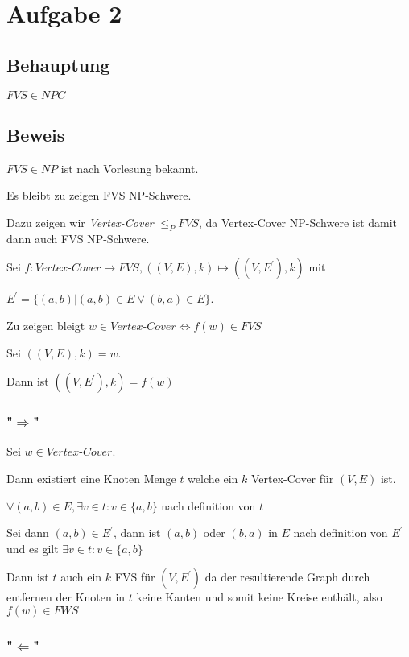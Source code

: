 \section*{Aufgabe 2}

\subsection*{Behauptung}

$FVS \in NPC$

\subsection*{Beweis}

$FVS \in NP$ ist nach Vorlesung bekannt.

Es bleibt zu zeigen FVS NP-Schwere.

Dazu zeigen wir \textit{Vertex-Cover} $\leq_P FVS$,
da Vertex-Cover NP-Schwere ist damit dann auch FVS NP-Schwere.

Sei $f: \textit{Vertex-Cover} \to FVS, ((V,E),k) \mapsto ((V,E^\prime),k)$ mit

 $E^\prime = \{(a,b) | (a,b) \in E \vee (b,a) \in E  \}$.
 
Zu zeigen bleigt $w \in \textit{Vertex-Cover} \Leftrightarrow f(w) \in FVS$

Sei $((V,E),k) =  w$.

Dann ist $((V,E^\prime),k) = f(w)$

\subsubsection*{"$\Rightarrow$"}
Sei $w \in \textit{Vertex-Cover}$.

Dann existiert eine Knoten Menge $t$ welche ein $k$ Vertex-Cover für $(V,E)$ ist.

$\forall (a,b) \in E, \exists v \in t: v \in \{a,b\}$ nach definition von $t$

Sei dann $(a,b) \in E^\prime$, dann ist $(a,b)$ oder $(b,a)$ 
in $E$ nach definition von $E^\prime$ und es gilt $\exists v \in t : v \in \{a,b\}$

Dann ist $t$ auch ein $k$ FVS für $(V,E^\prime)$ da der resultierende Graph durch entfernen der Knoten in $t$ keine Kanten und somit keine Kreise enthält, also $f(w) \in FWS$


\subsubsection*{"$\Leftarrow$"}

